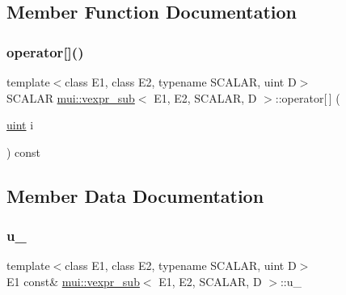 \subsection{Member Function Documentation}
\mbox{\label{structmui_1_1vexpr__sub_a7950fc7cf4b9eb4df0a41b2514e9115f}} 
\subsubsection{\texorpdfstring{operator[]()}{operator[]()}}
{\footnotesize\ttfamily template$<$class E1, class E2, typename S\+C\+A\+L\+AR, uint D$>$ \\
S\+C\+A\+L\+AR \hyperlink{structmui_1_1vexpr__sub}{mui\+::vexpr\+\_\+sub}$<$ E1, E2, S\+C\+A\+L\+AR, D $>$\+::operator\mbox{[}$\,$\mbox{]} (\begin{DoxyParamCaption}\item[{\hyperlink{namespacemui_af15a3e7188a2117fb9965277bb0cacd2}{uint}}]{i }\end{DoxyParamCaption}) const\hspace{0.3cm}{\ttfamily [inline]}}



\subsection{Member Data Documentation}
\mbox{\label{structmui_1_1vexpr__sub_a37bc25a35855f8f3fef162505351aab4}} 
\subsubsection{\texorpdfstring{u\+\_\+}{u\_}}
{\footnotesize\ttfamily template$<$class E1, class E2, typename S\+C\+A\+L\+AR, uint D$>$ \\
E1 const\& \hyperlink{structmui_1_1vexpr__sub}{mui\+::vexpr\+\_\+sub}$<$ E1, E2, S\+C\+A\+L\+AR, D $>$\+::u\+\_\+\hspace{0.3cm}{\ttfamily [protected]}}

\mbox{\label{structmui_1_1vexpr__sub_a7edddfe56f2a6dad3104d13e9b5d9e05}} 
